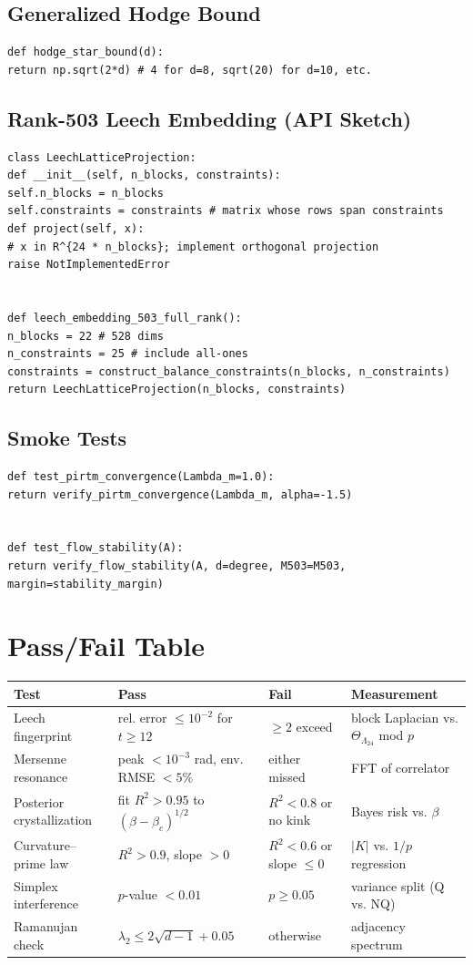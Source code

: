 \documentclass[11pt]{article}
\theoremstyle{definition}
\newcommand{\Leech}{\Lambda_{24}}
\newcommand{\degree}{d}
\begin{document}
\subsection*{Generalized Hodge Bound}
\begin{lstlisting}[style=py]
def hodge_star_bound(d):
return np.sqrt(2*d) # 4 for d=8, sqrt(20) for d=10, etc.
\end{lstlisting}


\subsection*{Rank-503 Leech Embedding (API Sketch)}
\begin{lstlisting}[style=py]
class LeechLatticeProjection:
def __init__(self, n_blocks, constraints):
self.n_blocks = n_blocks
self.constraints = constraints # matrix whose rows span constraints
def project(self, x):
# x in R^{24 * n_blocks}; implement orthogonal projection
raise NotImplementedError


def leech_embedding_503_full_rank():
n_blocks = 22 # 528 dims
n_constraints = 25 # include all-ones
constraints = construct_balance_constraints(n_blocks, n_constraints)
return LeechLatticeProjection(n_blocks, constraints)
\end{lstlisting}


\subsection*{Smoke Tests}
\begin{lstlisting}[style=py]
def test_pirtm_convergence(Lambda_m=1.0):
return verify_pirtm_convergence(Lambda_m, alpha=-1.5)


def test_flow_stability(A):
return verify_flow_stability(A, d=degree, M503=M503, margin=stability_margin)
\end{lstlisting}


\section{Pass/Fail Table}
\begin{center}
\begin{tabular}{@{}llll@{}}\toprule
Test & Pass & Fail & Measurement \\ \midrule
Leech fingerprint & rel. error $\le 10^{-2}$ for $t\ge 12$ & $\ge 2$ exceed & block Laplacian vs. $\Theta_{\Leech}$ mod $p$ \\
Mersenne resonance & peak $<10^{-3}$ rad, env. RMSE $<5\%$ & either missed & FFT of correlator \\
Posterior crystallization & fit $R^2>0.95$ to $(\beta-\beta_c)^{1/2}$ & $R^2<0.8$ or no kink & Bayes risk vs. $\beta$ \\
Curvature--prime law & $R^2>0.9$, slope $>0$ & $R^2<0.6$ or slope $\le 0$ & $|K|$ vs. $1/p$ regression \\
Simplex interference & $p$-value $<0.01$ & $p\ge 0.05$ & variance split (Q vs. NQ) \\
Ramanujan check & $\lambda_2\le 2\sqrt{\degree-1}+0.05$ & otherwise & adjacency spectrum \\
\bottomrule
\end{tabular}
\end{center}
\end{document}
